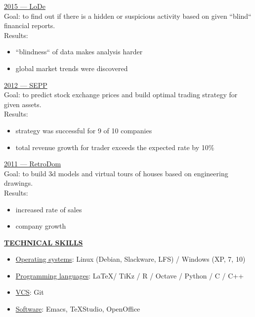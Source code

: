\documentclass[a4paper,10pt,fullpage]{article}
\begin{document}
\underline{2015 --- LoDe}\\
Goal: to find out if there is a hidden or suspicious activity  based on given 
``blind`` financial reports.\\
Results:
\begin{itemize}
	\item ``blindness`` of data makes analysis harder
	\item global market trends were discovered\\
\end{itemize}

\underline{2012 --- SEPP}\\
Goal: to predict stock exchange prices and build optimal trading strategy for 
given assets.\\
Results: 
\begin{itemize}
	\item strategy was successful for 9 of 10 companies
	\item total revenue growth for trader exceeds the expected rate by 10\%\\
\end{itemize}


\underline{2011 --- RetroDom}\\
Goal: to build 3d models and virtual tours of houses based on engineering 
drawings.\\
Results: 
\begin{itemize}
	\item increased rate of sales
	\item company growth\\
\end{itemize}

\begin{center}
	\underline{\textbf{TECHNICAL SKILLS}}
\end{center}
\begin{itemize}
	\item \underline{Operating systems}: \hspace{1.5cm} Linux (Debian, Slackware, LFS) / Windows (XP, 7, 10)
	\item \underline{Programming languages}: \hspace{0.6cm} \LaTeX / TiKz / R / Octave / Python / C / C++ 
	\item \underline{VCS}: \hspace{3.6cm} Git
	\item \underline{Software}: \hspace{3cm} Emacs, \TeX Studio, OpenOffice\\
\end{itemize}
\end{document}

